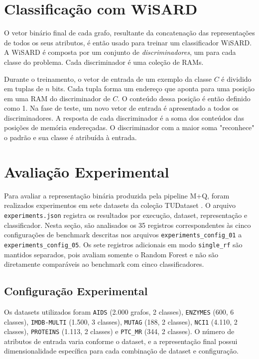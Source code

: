 \documentclass[12pt]{article}
\begin{document}
\section{Classificação com WiSARD}

O vetor binário final de cada grafo, resultante da concatenação das representações de todos os seus atributos, é então usado para treinar um classificador WiSARD. A WiSARD é composta por um conjunto de \textit{discriminadores}, um para cada classe do problema. Cada discriminador é uma coleção de RAMs.

Durante o treinamento, o vetor de entrada de um exemplo da classe $C$ é dividido em tuplas de $n$ bits. Cada tupla forma um endereço que aponta para uma posição em uma RAM do discriminador de $C$. O conteúdo dessa posição é então definido como 1. Na fase de teste, um novo vetor de entrada é apresentado a todos os discriminadores. A resposta de cada discriminador é a soma dos conteúdos das posições de memória endereçadas. O discriminador com a maior soma "reconhece" o padrão e sua classe é atribuída à entrada.

\section{Avaliação Experimental}

Para avaliar a representação binária produzida pela pipeline M+Q, foram realizados experimentos em sete datasets da coleção TUDataset \cite{morris2020}. O arquivo \texttt{experiments.json} registra os resultados por execução, dataset, representação e classificador. Nesta seção, são analisados os 35 registros correspondentes às cinco configurações de benchmark descritas nos arquivos \texttt{experiments\_config\_01} a \texttt{experiments\_config\_05}. Os sete registros adicionais em modo \texttt{single\_rf} são mantidos separados, pois avaliam somente o Random Forest e não são diretamente comparáveis ao benchmark com cinco classificadores.

\subsection{Configuração Experimental}

Os datasets utilizados foram \texttt{AIDS} (2.000 grafos, 2 classes), \texttt{ENZYMES} (600, 6 classes), \texttt{IMDB-MULTI} (1.500, 3 classes), \texttt{MUTAG} (188, 2 classes), \texttt{NCI1} (4.110, 2 classes), \texttt{PROTEINS} (1.113, 2 classes) e \texttt{PTC\_MR} (344, 2 classes). O número de atributos de entrada varia conforme o dataset, e a representação final possui dimensionalidade específica para cada combinação de dataset e configuração.
\end{document}
